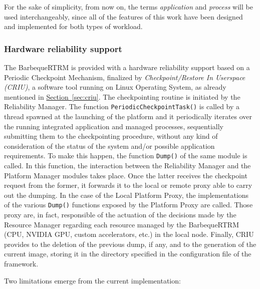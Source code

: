 For the sake of simplicity, from now on, the terms \emph{application} and \emph{process} will be used interchangeably, since all of the features of this work have been designed and implemented for both types of workload.

\subsubsection{Hardware reliability support}
\label{sec:periodicchk}
The BarbequeRTRM is provided with a hardware reliability support based on a Periodic Checkpoint Mechanism, finalized by \emph{Checkpoint/Restore In Userspace (CRIU)}, a software tool running on Linux Operating System, as already mentioned in {\hyperref[sec:criu]{Section~\ref{sec:criu}}}. The checkpointing routine is initiated by the Reliability Manager. The function \verb|PeriodicCheckpointTask()| is called by a thread spawned at the launching of the platform and it periodically iterates over the running integrated application and managed processes, sequentially submitting them to the checkpointing procedure, without any kind of consideration of the status of the system and/or possible application requirements. To make this happen, the function \verb|Dump()| of the same module is called.  In this function, the interaction between the Reliability Manager and the Platform Manager modules takes place. Once the latter receives the checkpoint request from the former, it forwards it to the local or remote proxy able to carry out the dumping. In the case of the Local Platform Proxy, the implementations of the various \verb|Dump()| functions exposed by the Platform Proxy are called. Those proxy are, in fact, responsible of the actuation of the decisions made by the Resource Manager regarding each resource managed by the  BarbequeRTRM (CPU, NVIDIA GPU, custom accelerators, etc.) in the local node. Finally, CRIU provides to the deletion of the previous dump, if any, and to the generation of the current image, storing it in the directory specified in the configuration file of the framework.

Two limitations emerge from the current implementation:

